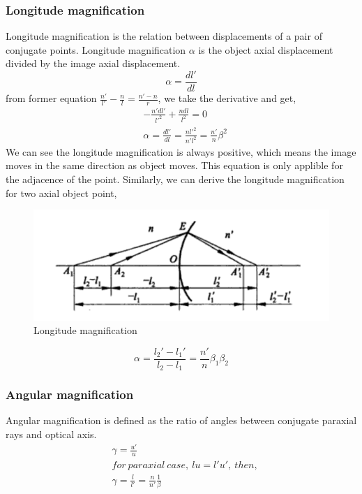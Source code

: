 \documentclass[../main.tex]{subfiles}
\begin{document}
	\subsubsection{Longitude magnification}
	Longitude magnification is the relation between displacements of a pair of conjugate points. Longitude magnification $\alpha$ is the object axial displacement divided by the image axial displacement.
	\begin{equation}
		\alpha=\frac{dl'}{dl}
	\end{equation}
	from former equation $\frac{n'}{l'}-\frac{n}{l}=\frac{n'-n}{r}$, we take the derivative and get,
	\begin{align}
		&-\frac{n'dl'}{{l'}^2}+\frac{ndl}{l^2}=0\\
		&\alpha=\frac{dl'}{dl}=\frac{nl'^2}{n'l^2}=\frac{n'}{n}\beta^2
	\end{align}
	We can see the longitude magnification is always positive, which means the image moves in the same direction as object moves. This equation is only applible for the adjacence of the point. Similarly, we can derive the longitude magnification for two axial object point,
	\begin{figure}[h!]
		\centering
		\includegraphics[scale=0.5]{../graphics/Geometrical_optics9.png}
		\caption{Longitude magnification}
		\label{fig:longitude}
	\end{figure}
	\begin{equation}
		\alpha=\frac{l_2'-l_1'}{l_2-l_1}=\frac{n'}{n}\beta_1\beta_2
	\end{equation}
	\subsubsection{Angular magnification}
	Angular magnification is defined as the ratio of angles between conjugate paraxial rays and optical axis.
	\begin{align}
	&\gamma=\frac{u'}{u}\\
	&for\ paraxial\ case,\ lu=l'u',\ then,\\
	&\gamma=\frac{l}{l'}=\frac{n}{n'}\frac{1}{\beta}
	\end{align}
\end{document}
